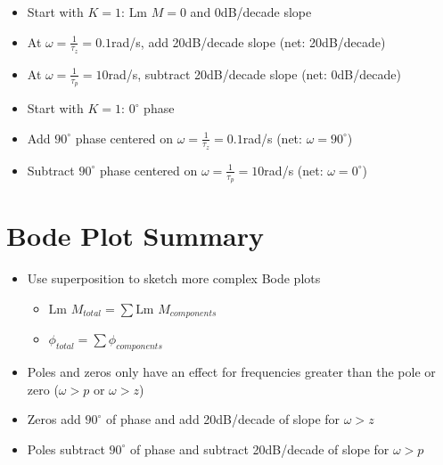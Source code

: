 \documentclass{book}
\newcommand{\Lm}{\textrm{Lm }}
\begin{document}
\begin{minipage}{0.49\textwidth}
	\centering
	\begin{itemize}
		\item Start with $ K=1 $: $ \Lm M = 0 $ and 0dB/decade slope
		\item At $ \omega = \frac{1}{\tau_z} = 0.1 $rad/s, add 20dB/decade slope (net: 20dB/decade)
		\item At $ \omega = \frac{1}{\tau_p} = 10 $rad/s, subtract 20dB/decade slope (net: 0dB/decade)
	\end{itemize}
\end{minipage}
\hfill
\begin{minipage}{0.49\textwidth}
	\centering
	\begin{itemize}
		\item Start with $ K=1 $: $ 0^\circ $ phase
		\item Add $ 90^\circ $ phase centered on $ \omega = \frac{1}{\tau_z} = 0.1 $rad/s (net: $ \omega=90^\circ $)
		\item Subtract $ 90^\circ $ phase centered on $ \omega = \frac{1}{\tau_p} = 10 $rad/s (net: $ \omega=0^\circ $)
	\end{itemize}
\end{minipage}

\section*{Bode Plot Summary}
\begin{itemize}
	\item Use superposition to sketch more complex Bode plots
	\begin{itemize}
		\item $ \Lm M_{total} = \sum \Lm M_{components} $
		\item $ \phi_{total} = \sum \phi_{components} $
	\end{itemize}
	\item Poles and zeros only have an effect for frequencies greater than the pole or zero ($ \omega>p $ or $ \omega>z $)
	\item Zeros add $ 90^\circ $ of phase and add 20dB/decade of slope for $ \omega>z $
	\item Poles subtract $ 90^\circ $ of phase and subtract 20dB/decade of slope for $ \omega>p $
\end{itemize}
\end{document}
